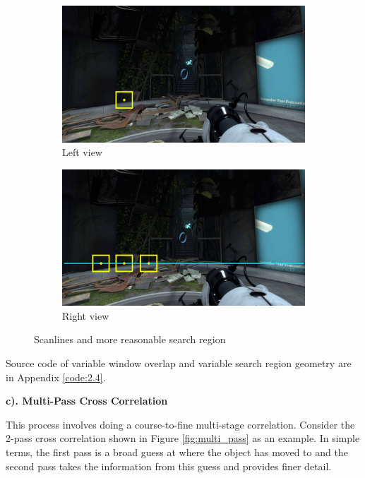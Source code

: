 \begin{figure}[h!]
	\centering
	\begin{subfigure}[t]{0.48\linewidth}
		\centering
		\includegraphics[width=1\linewidth]{figures/part2/search_region1a}
		\caption{Left view}
	\end{subfigure}
	\begin{subfigure}[t]{0.48\linewidth}
		\centering
		\includegraphics[width=1\linewidth]{figures/part2/search_region1b}
		\caption{Right view}
		\label{fig:search_region1b}
	\end{subfigure}
	\caption{Scanlines and more reasonable search region}
	\label{fig:search_region1}
\end{figure}

Source code of variable window overlap and variable search region geometry are in Appendix \ref{code:2.4}.

\textbf{c). Multi-Pass Cross Correlation}

This process involves doing a course-to-fine multi-stage correlation. Consider the 2-pass cross correlation shown in Figure \ref{fig:multi_pass} as an example. In simple terms, the first pass is a broad guess at where the object has moved to and the second pass takes the information from this guess and provides finer detail.

